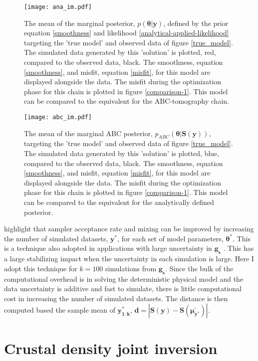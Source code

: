 \begin{figure}[H]
	\centering
	\texttt{[image: ana\_im.pdf]}
	\caption{The mean of the marginal posterior, $p(\bm{\theta}|\bm{y})$, defined by the prior equation \ref{smoothness} and likelihood \ref{analytical-applied-likelihood} targeting the 'true model' and observed data of figure \ref{true_model}. The simulated data generated by this 'solution' is plotted, red, compared to the observed data, black. The smoothness, equation \ref{smoothness}, and misfit, equation \ref{misfit}, for this model are displayed alongside the data. The misfit during the optimization phase for this chain is plotted in figure \ref{comparison-1}. This model can be compared to the equivalent for the ABC-tomography chain.}
	\label{ana-im-1}
\end{figure}

\begin{figure}[H]
	\centering
	\texttt{[image: abc\_im.pdf]}
	\caption{The mean of the marginal ABC posterior, $p_{ABC}(\bm{\theta}|\bm{S}(\bm{y}))$, targeting the 'true model' and observed data of figure \ref{true_model}. The simulated data generated by this 'solution' is plotted, blue, compared to the observed data, black. The smoothness, equation \ref{smoothness}, and misfit, equation \ref{misfit}, for this model are displayed alongside the data. The misfit during the optimization phase for this chain is plotted in figure \ref{comparison-1}. This model can be compared to the equivalent for the analytically defined posterior.}
	\label{abc-im-1}
\end{figure}

\citet{Sisson2010a} highlight that sampler acceptance rate and mixing can be improved by increasing the number of simulated datasets, $\bm{y^*}$, for each set of model parameters, $\bm{\theta^*}$. This is a technique also adopted in applications with large uncertainty in $\bm{g_s}$ \citep{Ratmann2009,Wood2010}. This has a large stabilizing impact when the uncertainty in each simulation is large. Here I adopt this technique for $k = 100$ simulations from $\bm{g_s}$. Since the bulk of the computational overhead is in solving the deterministic physical model and the data uncertainty is additive and fast to simulate, there is little computational cost in increasing  the number of simulated datasets. The distance is then computed based the sample mean of $\bm{y^*_{1:k}}$, $\bm{d} = |\bm{S}(\bm{y})-\bm{S}(\bm{\bar{\mu_{y^*}}})|$.


\section{Crustal density joint inversion}

